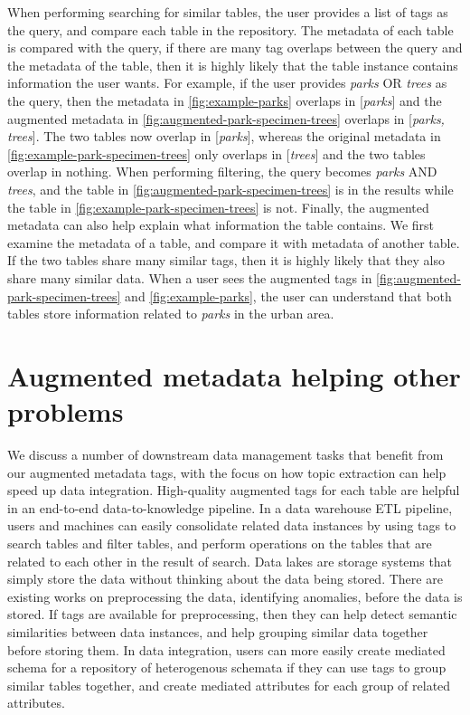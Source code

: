 When performing searching for similar tables, the user provides a list of tags as the query, and compare each table in the repository. The metadata of each table is compared with the query, if there are many tag overlaps between the query and the metadata of the table, then it is highly likely that the table instance contains information the user wants. For example, if the user provides \textit{parks} OR \textit{trees} as the query, then the metadata in \autoref{fig:example-parks} overlaps in [\textit{parks}] and the augmented metadata in \autoref{fig:augmented-park-specimen-trees} overlaps in [\textit{parks, trees}]. The two tables now overlap in [\textit{parks}], whereas the original metadata in \autoref{fig:example-park-specimen-trees} only overlaps in [\textit{trees}] and the two tables overlap in nothing. When performing filtering, the query becomes \textit{parks} AND \textit{trees}, and the table in \autoref{fig:augmented-park-specimen-trees} is in the results while the table in \autoref{fig:example-park-specimen-trees} is not. Finally, the augmented metadata can also help explain what information the table contains. We first examine the metadata of a table, and compare it with metadata of another table. If the two tables share many similar tags, then it is highly likely that they also share many similar data. When a user sees the augmented tags in \autoref{fig:augmented-park-specimen-trees} and \autoref{fig:example-parks}, the user can understand that both tables store information related to \textit{parks} in the urban area.

\section{Augmented metadata helping other problems}
\label{sec:AugmentedMetadataHelpingOtherProblems}

We discuss a number of downstream data management tasks that benefit from our augmented metadata tags, with the focus on how topic extraction can help speed up data integration. High-quality augmented tags for each table are helpful in an end-to-end data-to-knowledge pipeline. In a data warehouse ETL pipeline, users and machines can easily consolidate related data instances by using tags to search tables and filter tables, and perform operations on the tables that are related to each other in the result of search. Data lakes are storage systems that simply store the data without thinking about the data being stored. There are existing works on preprocessing the data, identifying anomalies, before the data is stored. If tags are available for preprocessing, then they can help detect semantic similarities between data instances, and help grouping similar data together before storing them. In data integration, users can more easily create mediated schema for a repository of heterogenous schemata if they can use tags to group similar tables together, and create mediated attributes for each group of related attributes.

